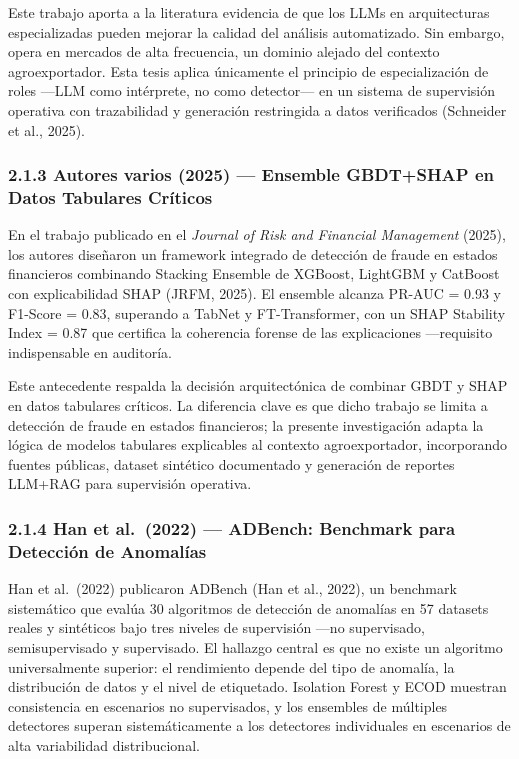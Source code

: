 Este trabajo aporta a la literatura evidencia de que los LLMs en
arquitecturas especializadas pueden mejorar la calidad del análisis
automatizado. Sin embargo, opera en mercados de alta frecuencia, un
dominio alejado del contexto agroexportador. Esta tesis aplica
únicamente el principio de especialización de roles ---LLM como
intérprete, no como detector--- en un sistema de supervisión operativa
con trazabilidad y generación restringida a datos verificados (Schneider
et al., 2025).

\subsubsection{2.1.3 Autores varios (2025) --- Ensemble GBDT+SHAP en
Datos Tabulares
Críticos}\label{autores-varios-2025-ensemble-gbdtshap-en-datos-tabulares-cruxedticos}

En el trabajo publicado en el \emph{Journal of Risk and Financial
Management} (2025), los autores diseñaron un framework integrado de
detección de fraude en estados financieros combinando Stacking Ensemble
de XGBoost, LightGBM y CatBoost con explicabilidad SHAP (JRFM, 2025). El
ensemble alcanza PR-AUC = 0.93 y F1-Score = 0.83, superando a TabNet y
FT-Transformer, con un SHAP Stability Index = 0.87 que certifica la
coherencia forense de las explicaciones ---requisito indispensable en
auditoría.

Este antecedente respalda la decisión arquitectónica de combinar GBDT y
SHAP en datos tabulares críticos. La diferencia clave es que dicho
trabajo se limita a detección de fraude en estados financieros; la
presente investigación adapta la lógica de modelos tabulares explicables
al contexto agroexportador, incorporando fuentes públicas, dataset
sintético documentado y generación de reportes LLM+RAG para supervisión
operativa.

\subsubsection{2.1.4 Han et al.~(2022) --- ADBench: Benchmark para
Detección de
Anomalías}\label{han-et-al.-2022-adbench-benchmark-para-detecciuxf3n-de-anomaluxedas}

Han et al.~(2022) publicaron ADBench (Han et al., 2022), un benchmark
sistemático que evalúa 30 algoritmos de detección de anomalías en 57
datasets reales y sintéticos bajo tres niveles de supervisión ---no
supervisado, semisupervisado y supervisado. El hallazgo central es que
no existe un algoritmo universalmente superior: el rendimiento depende
del tipo de anomalía, la distribución de datos y el nivel de etiquetado.
Isolation Forest y ECOD muestran consistencia en escenarios no
supervisados, y los ensembles de múltiples detectores superan
sistemáticamente a los detectores individuales en escenarios de alta
variabilidad distribucional.

